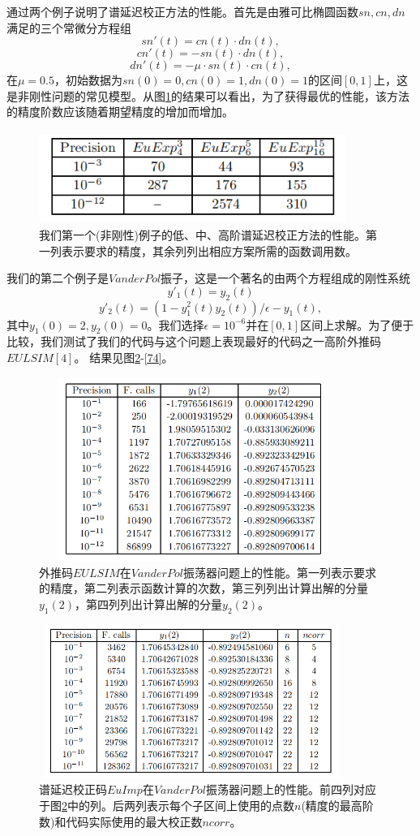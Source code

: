 \documentclass[12pt,a4paper]{article}
\begin{document}
通过两个例子说明了谱延迟校正方法的性能。首先是由雅可比椭圆函数$sn,cn,dn$满足的三个常微分方程组\\
$$ sn'(t)=cn(t) \cdot dn(t),$$
$$cn'(t)=-sn(t) \cdot dn(t),$$
$$dn'(t)= -\mu \cdot sn(t) \cdot cn(t),$$
在$\mu=0.5$，初始数据为$sn(0)=0,cn(0)=1,dn(0)=1$的区间$[0,1]$上，这是非刚性问题的常见模型。从图\ref{7.1}的结果可以看出，为了获得最优的性能，该方法的精度阶数应该随着期望精度的增加而增加。\\
\begin{figure}[h]
	\centering
	\includegraphics[width=10cm,height=3cm]{./figures/71.png}
	\caption{我们第一个(非刚性)例子的低、中、高阶谱延迟校正方法的性能。第一列表示要求的精度，其余列列出相应方案所需的函数调用数。}
	\label{7.1}
\end{figure}
我们的第二个例子是$Van der Pol$振子，这是一个著名的由两个方程组成的刚性系统\\
$$y'_1(t)=y_2(t)$$
$$y'_2(t)=(1-y_1^2(t)y_2(t))/ \epsilon -y_1(t),$$
其中$y_1(0)=2,y_2(0)=0$。我们选择$\epsilon=10^{-6}$并在$[0,1]$区间上求解。为了便于比较，我们测试了我们的代码与这个问题上表现最好的代码之一高阶外推码$EULSIM[4]$。 结果见图\ref{72}-\ref{74}。\\
\begin{figure}[h]
	\centering
	\includegraphics[width=10cm,height=6cm]{./figures/72.png}
	\caption{外推码$EULSIM$在$Van der Pol$振荡器问题上的性能。第一列表示要求的精度，第二列表示函数计算的次数，第三列列出计算出解的分量$y_1(2)$，第四列列出计算出解的分量$y_2(2)$。}
	\label{72}
\end{figure}
\begin{figure}[h]
	\centering
	\includegraphics[width=10cm,height=5cm]{./figures/73.png}
	\caption{谱延迟校正码$EuImp$在$Van der Pol$振荡器问题上的性能。前四列对应于图\ref{72}中的列。后两列表示每个子区间上使用的点数$n$(精度的最高阶数)和代码实际使用的最大校正数$ncorr$。}
	\label{73}
\end{figure}
\end{document}

